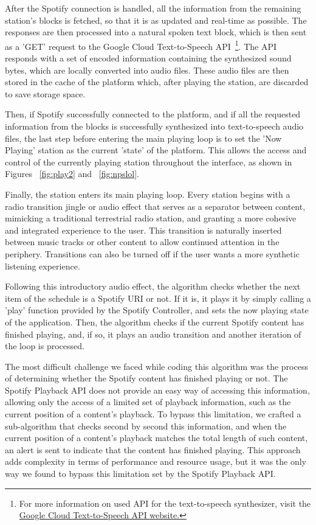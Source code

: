 After the Spotify connection is handled, all the information from the remaining station's blocks is fetched, so that it is as updated and real-time as possible. The responses are then processed into a natural spoken text block, which is then sent as a 'GET' request to the Google Cloud Text-to-Speech API~\footnote{For more information on used API for the text-to-speech synthesizer, visit the \href{https://cloud.google.com/text-to-speech/docs}{Google Cloud Text-to-Speech API website.}}. The API responds with a set of encoded information containing the synthesized sound bytes, which are locally converted into audio files. These audio files are then stored in the cache of the platform which, after playing the station, are discarded to save storage space.

Then, if Spotify successfully connected to the platform, and if all the requested information from the blocks is successfully synthesized into text-to-speech audio files, the last step before entering the main playing loop is to set the 'Now Playing' station as the current 'state' of the platform. This allows the access and control of the currently playing station throughout the interface, as shown in Figures ~\ref{fig:play2} and ~\ref{fig:npslol}.

Finally, the station enters its main playing loop. Every station begins with a radio transition jingle or audio effect that serves as a separator between content, mimicking a traditional terrestrial radio station, and granting a more cohesive and integrated experience to the user. This transition is naturally inserted between music tracks or other content to allow continued attention in the periphery. Transitions can also be turned off if the user wants a more synthetic listening experience.

Following this introductory audio effect, the algorithm checks whether the next item of the schedule is a Spotify \ac{URI} or not. If it is, it plays it by simply calling a 'play' function provided by the Spotify Controller, and sets the now playing state of the application. Then, the algorithm checks if the current Spotify content has finished playing, and, if so, it plays an audio transition and another iteration of the loop is processed.

The most difficult challenge we faced while coding this algorithm was the process of determining whether the Spotify content has finished playing or not. The Spotify Playback \ac{API} does not provide an easy way of accessing this information, allowing only the access of a limited set of playback information, such as the current position of a content's playback. To bypass this limitation, we crafted a sub-algorithm that checks second by second this information, and when the current position of a content's playback matches the total length of such content, an alert is sent to indicate that the content has finished playing. This approach adds complexity in terms of performance and resource usage, but it was the only way we found to bypass this limitation set by the Spotify Playback \ac{API}.

